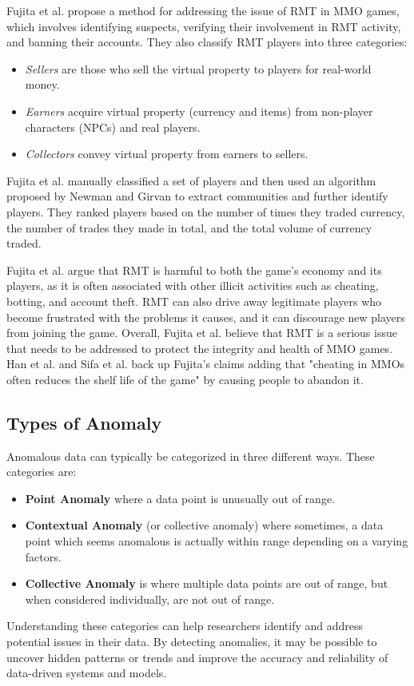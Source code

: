 \documentclass[journal]{IEEEtran}
\begin{document}
Fujita et al. propose a method for addressing the issue of RMT in MMO games, which involves identifying suspects, verifying their involvement in RMT activity, and banning their accounts\cite{Fujita2011}. They also classify RMT players into three categories: 
\begin{itemize}
    \item \textit{Sellers} are those who sell the virtual property to players for real-world money.
    \item \textit{Earners} acquire virtual property (currency and items) from non-player characters (NPCs) and real players.
    \item \textit{Collectors} convey virtual property from earners to sellers.
\end{itemize}

Fujita et al. manually classified a set of players and then used an algorithm proposed by Newman and Girvan\cite{Girvan2002} to extract communities and further identify players. They ranked players based on the number of times they traded currency, the number of trades they made in total, and the total volume of currency traded.

Fujita et al. argue that RMT is harmful to both the game's economy and its players, as it is often associated with other illicit activities such as cheating, botting, and account theft. RMT can also drive away legitimate players who become frustrated with the problems it causes, and it can discourage new players from joining the game\cite{Sifa2021}. Overall, Fujita et al. believe that RMT is a serious issue that needs to be addressed to protect the integrity and health of MMO games. Han et al. and Sifa et al. back up Fujita's claims adding that "cheating in MMOs often reduces the shelf life of the game" by causing people to abandon it\cite{Han2022}\cite{Sifa2021}.

\subsection{Types of Anomaly}
\noindent Anomalous data can typically be categorized in three different ways\cite{Ahmed2016}\cite{Bhuyan2013}. These categories are:
\begin{itemize}
    \item \textbf{Point Anomaly} where a data point is unusually out of range.
    \item \textbf{Contextual Anomaly} (or collective anomaly\cite{Song2007}) where sometimes, a data point which seems anomalous is actually within range depending on a varying factors.
    \item \textbf{Collective Anomaly} is where multiple data points are out of range, but when considered individually, are not out of range.
\end{itemize}
Understanding these categories can help researchers identify and address potential issues in their data. By detecting anomalies, it may be possible to uncover hidden patterns or trends and improve the accuracy and reliability of data-driven systems and models.
\end{document}

